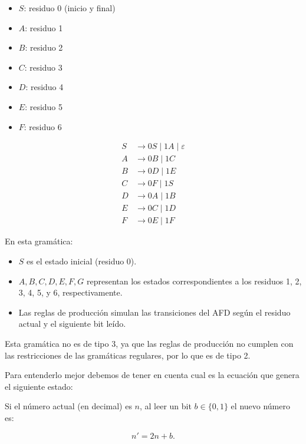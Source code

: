 \documentclass[12pt]{book} %
\begin{document}
\begin{ejercicio}
\begin{itemize}
\begin{itemize}
\begin{solucion}[difícil.b]
        \begin{itemize}
            \item $S$: residuo 0 (inicio y final)
            \item $A$: residuo 1
            \item $B$: residuo 2
            \item $C$: residuo 3
            \item $D$: residuo 4
            \item $E$: residuo 5
            \item $F$: residuo 6
        \end{itemize}

        \begin{align*}
        S &\rightarrow 0S \mid 1A \mid \varepsilon \\
        A &\rightarrow 0B \mid 1C \\
        B &\rightarrow 0D \mid 1E \\
        C &\rightarrow 0F \mid 1S \\
        D &\rightarrow 0A \mid 1B \\
        E &\rightarrow 0C \mid 1D \\
        F &\rightarrow 0E \mid 1F
        \end{align*}

        En esta gramática: 
        
        \begin{itemize}
            \item $S$ es el estado inicial (residuo 0).
            \item $A, B, C, D, E, F, G$ representan los estados correspondientes a los residuos 1, 2, 3, 4, 5, y 6, respectivamente.
            \item Las reglas de producción simulan las transiciones del AFD según el residuo actual y el siguiente bit leído.
        \end{itemize}

        Esta gramática no es de tipo 3, ya que las reglas de producción no cumplen con las restricciones de las gramáticas regulares, por lo que es de tipo 2.

        Para entenderlo mejor debemos de tener en cuenta cual es la ecuación que genera el siguiente estado:


        Si el número actual (en decimal) es $n$, al leer un bit $b \in \{0, 1\}$ el nuevo número es:

        $$
        n' = 2n + b.
        $$


\end{solucion}
\end{itemize}
\end{itemize}
\end{ejercicio}
\end{document}

